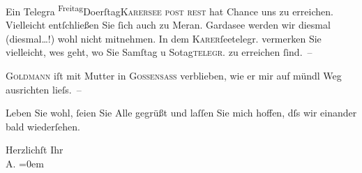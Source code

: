 \pstart
           Ein Telegra{\geminationm}{ }\substVorne{}\textsuperscript{Freitag}\substDazwischen{}Do{\geminationn}erſtag\substHinten{}{ }\textsc{Karersee post rest} hat Chance uns zu
               erreichen. Vielleicht entſchließen Sie{ }ſich auch zu Meran. Gardasee werden wir diesmal
                  (diesmal{\dots}!) wohl nicht mitnehmen. In dem \textsc{Karer}ſeetelegr. vermerken Sie vielleicht, we{\geminationn}s geht, wo Sie Samſtag{ }{\pb}u So{\geminationn}tag\textsc{telegr.} zu erreichen{ }ſind. –\pend
           
\pstart
           \textsc{Goldmann} iſt mit Mutter in \textsc{Gossensass} verblieben, wie er mir auf mündl Weg ausrichten lieſs. –\pend
           
\pstart
           Leben Sie wohl,{ }ſeien Sie Alle gegrüßt und laſſen Sie mich hoffen, dſs wir einander
               bald wiederſehen.\pend
           
\pstart
           Herzlichſt Ihr{\\[\baselineskip]}\spacefill\mbox{A.}\pend
           \leftskip=0em{}\endnumbering{}  \newcommand{\dateiname}{L01702}\newcommand{\titel}{Arthur Schnitzler an Richard Beer-Hofmann, 25. 8. 1907}\newcommand{\editorInnen}{Martin Anton Müller und Gerd-Hermann Susen}
